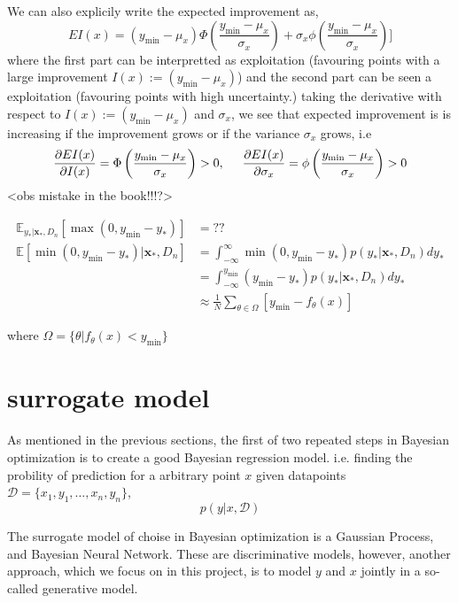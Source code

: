 We can also explicily write the expected improvement as, 
$$EI(x) = (y_{\min}-\mu_x)\Phi\left(\frac{y_{\min}-\mu_x}{\sigma_x}\right)+ \sigma_x
\phi\left(\frac{y_{\min}-\mu_x}{\sigma_x}\right)]$$
where the first part can be interpretted as exploitation (favouring points with a large improvement $I(x) := (y_{\min}-\mu_x)$)
and the second part can be seen a exploitation (favouring points with high uncertainty.)
taking the derivative with respect to $I(x) := (y_{\min}-\mu_x)$ and $\sigma_x$, we see that expected improvement is 
is increasing if the improvement grows or if the variance $\sigma_x$ grows, i.e
$$\frac{\partial EI(x)}{\partial I(x)} = \Phi\left(\frac{y_{\min}-\mu_x}{\sigma_x}\right) > 0, \hspace*{0.5cm} 
\frac{\partial EI(x)}{\partial \sigma_x} = \phi\left(\frac{y_{\min}-\mu_x}{\sigma_x}\right) >0$$ 
<obs mistake in the book!!!?>





\begin{align*}
    \mathbb{E}_{y_*|\textbf{x}_*,D_n}[\max(0,y_{\min}-y_*)] &= ??\\
    \mathbb{E}[\min(0,y_{\min}-y_*)|\textbf{x}_*,D_n] &= \int_{-\infty}^\infty \min(0,y_{\min}-y_*) p(y_*|\textbf{x}_*,D_n) dy_*\\
    &= \int_{-\infty}^{y_{\min}} (y_{\min}-y_*) p(y_*|\textbf{x}_*,D_n) dy_*\\
    &\approx \frac{1}{N} \sum_{\theta \in \Omega } [y_{\min}-f_\theta(x)]
\end{align*}

where $\Omega = \{\theta|f_{\theta}(x)< y_{\min}\}$



\section{surrogate model}
As mentioned in the previous sections, the first of two repeated steps in Bayesian optimization
is to create a good Bayesian regression model. %
i.e. finding the probility of prediction for a arbitrary point $x$ given datapoints 
$\mathcal{D} = \{x_1, y_1, \dots, x_n, y_n\}$, 
 $$p(y|x,\mathcal{D})$$

The surrogate model of choise in Bayesian optimization is a Gaussian Process, and Bayesian Neural Network.
These are discriminative models, however, another approach, which we focus on in this project, is
to model $y$ and $x$ jointly in a so-called generative model.




